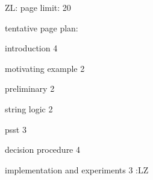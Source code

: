 \documentclass{llncs}
\newcommand{\zhilin}[1]{\color{brown} {ZL: #1 :LZ} \color{black}}
\newcommand{\zhilin}[1]{}
\begin{document}



\zhilin{
page limit: 20

tentative page plan: 

introduction 4

motivating example 2

preliminary 2

string logic 2

psst 3

decision procedure 4 

implementation and experiments 3
}









%









 






%





\newpage
\appendix


\end{document}
